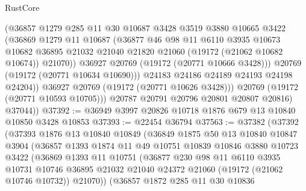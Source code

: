 \begin{lexlean}{RustCore}
\begin{coremodule}
                    (@36857
                      @1279
                      @285
                      @11
                      @30
                      @10687
                      @3428
                      @3519
                      @3880
                      @10665
                      @3422
                      (@36869
                        @1279
                        @11
                        @10687
                        (@36877
                          @46
                          @98
                          @11
                          @6110
                          @3935
                          @10673
                          @10682
                          @36895
                          @21032
                          @21040
                          @21820
                          @21060
                          (@19172 (@21062 @10682 @10674))
                          @21070))
                      @36927
                      @20769
                      (@19172 (@20771 @10666 @3428)))
                    @20769
                    (@19172 (@20771 @10634 @10690)))
                  @24183
                  @24186
                  @24189
                  @24193
                  @24198
                  @24204))
              @36927
              @20769
              (@19172 (@20771 @10626 @3428)))
            @20769
            (@19172 (@20771 @10593 @10705)))
          @20787
          @20791
          @20796
          @20801
          @20807
          @20816)
        @37044))
@37392 := @36949 @3997 @20826 @10718 @1876 @679 @13 @10840 @10850 @3428 @10853
@37393 := @22454 @36794
@37563 := @37382
    (@37392
      (@37393
        @1876
        @13
        @10840
        @10849
        (@36849
          @1875
          @50
          @13
          @10840
          @10847
          @3904
          (@36857
            @1393
            @1874
            @11
            @49
            @10751
            @10839
            @10846
            @3880
            @10723
            @3422
            (@36869
              @1393
              @11
              @10751
              (@36877
                @230
                @98
                @11
                @6110
                @3935
                @10731
                @10746
                @36895
                @21032
                @21040
                @24372
                @21060
                (@19172 (@21062 @10746 @10732))
                @21070))
            (@36857
              @1872
              @285
              @11
              @30
              @10836

\end{coremodule}
\end{lexlean}
